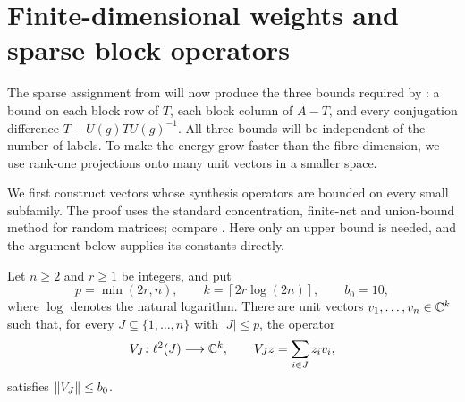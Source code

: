 \section{Finite-dimensional weights and sparse block operators}
\label{sec:weights}

The sparse assignment from  will now produce the three
bounds required by : a bound on each
block row of \(T\), each block column of \(A-T\), and every conjugation
difference \(T-U(g)TU(g)^{-1}\). All three bounds will be independent
of the number of labels. To make the energy grow faster than the fibre
dimension, we use rank-one projections onto many unit vectors in a
smaller space.

We first construct vectors whose synthesis operators are bounded on
every small subfamily. The proof uses the standard concentration,
finite-net and union-bound method for random matrices; compare
\cite[Section~5]{BDDW2008}. Here only an upper bound is needed, and the
argument below supplies its constants directly.

\begin{lemma}
\label{lem:frames}
Let $n\ge 2$ and $r\ge 1$ be integers, and put
\begin{equation}
\label{eq:frame-parameters}
 p=\min(2r,n),\qquad
 k=\left\lceil 2r\log(2n)\right\rceil,
 \qquad b_0=10,
\end{equation}
where $\log$ denotes the natural logarithm.  There are unit vectors
$v_1,\ldots,v_n\in\mathbb C^k$ such that, for every
$J\subseteq\{1,\ldots,n\}$ with $|J|\le p$, the operator
\[
 V_J\colon\ell^2(J)\longrightarrow\mathbb C^k,
 \qquad V_J z=\sum_{i\in J}z_i v_i,
\]
satisfies $\left\lVert V_J\right\rVert\le b_0$.
\end{lemma}

